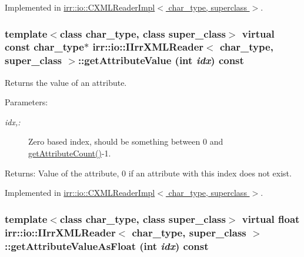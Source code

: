 Implemented in \hyperlink{classirr_1_1io_1_1_c_x_m_l_reader_impl_7252bf5d02f9cc05ade31e658502116a}{irr::io::CXMLReaderImpl$<$ char\_\-type, superclass $>$}.\hypertarget{classirr_1_1io_1_1_i_irr_x_m_l_reader_41bd71a1b9d4a80cd1d0257dedb35325}{
\subsubsection[{getAttributeValue}]{\setlength{\rightskip}{0pt plus 5cm}template$<$class char\_\-type, class super\_\-class$>$ virtual const char\_\-type$\ast$ {\bf irr::io::IIrrXMLReader}$<$ char\_\-type, super\_\-class $>$::getAttributeValue (int {\em idx}) const}}
\label{classirr_1_1io_1_1_i_irr_x_m_l_reader_41bd71a1b9d4a80cd1d0257dedb35325}


Returns the value of an attribute. 

\begin{Desc}
\item[Parameters:]
\begin{description}
\item[{\em idx,:}]Zero based index, should be something between 0 and \hyperlink{classirr_1_1io_1_1_i_irr_x_m_l_reader_eaa1cfc860be7b788f78edec403cc2a2}{getAttributeCount()}-1. \end{description}
\end{Desc}
\begin{Desc}
\item[Returns:]Value of the attribute, 0 if an attribute with this index does not exist. \end{Desc}


Implemented in \hyperlink{classirr_1_1io_1_1_c_x_m_l_reader_impl_55bc001ac65fa308a04b65bc1529aa4b}{irr::io::CXMLReaderImpl$<$ char\_\-type, superclass $>$}.\hypertarget{classirr_1_1io_1_1_i_irr_x_m_l_reader_3a01b3cec9db01d00928074846d39add}{
\subsubsection[{getAttributeValueAsFloat}]{\setlength{\rightskip}{0pt plus 5cm}template$<$class char\_\-type, class super\_\-class$>$ virtual float {\bf irr::io::IIrrXMLReader}$<$ char\_\-type, super\_\-class $>$::getAttributeValueAsFloat (int {\em idx}) const}}
\label{classirr_1_1io_1_1_i_irr_x_m_l_reader_3a01b3cec9db01d00928074846d39add}


